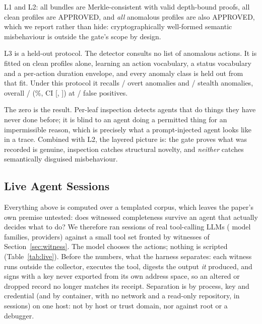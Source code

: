 \documentclass[letterpaper,10pt,twocolumn]{article}
\theoremstyle{definition}
\begin{document}
L1 and L2: all bundles are Merkle-consistent with valid depth-bound proofs, all clean profiles are APPROVED, and \emph{all} anomalous profiles are also APPROVED, which we report rather than hide: cryptographically well-formed semantic misbehaviour is outside the gate's scope by design.

L3 is a held-out protocol. The detector consults no list of anomalous actions. It is fitted on clean profiles alone, learning an action vocabulary, a status vocabulary and a per-action duration envelope, and every anomaly class is held out from that fit. Under this protocol it recalls \insOvertK/\insOvertN{} overt anomalies and \insStealthK/\insStealthN{} stealth anomalies, overall \insRecallK/\insRecallN{} (\insRecallPct\%, CI [\insRecallCIlo, \insRecallCIhi]) at \insFPK/\insFPN{} false positives.

The zero is the result. Per-leaf inspection detects agents that do things they have never done before; it is blind to an agent doing a permitted thing for an impermissible reason, which is precisely what a prompt-injected agent looks like in a trace. Combined with L2, the layered picture is: the gate proves what was recorded is genuine, inspection catches structural novelty, and \emph{neither} catches semantically disguised misbehaviour.

\subsection{Live Agent Sessions}\label{sec:live}
Everything above is computed over a templated corpus, which leaves the paper's
own premise untested: does witnessed completeness survive an agent that actually
decides what to do? We therefore ran \liveSessions{} sessions of real
tool-calling LLMs (\liveModelCount{} model families,
\liveProviderCount{} providers) against a small tool set fronted by
witnesses of Section~\ref{sec:witness}. The model chooses the actions; nothing
is scripted (Table~\ref{tab:live}). Before the numbers, what the harness separates: each witness runs outside the collector, executes the
tool, digests the output \emph{it} produced, and signs with a key never
exported from its own address space, so an altered or dropped record no longer
matches its receipt. Separation is by process, key and
credential  (and by container, with no network and a read-only repository,
in \liveIsoContainer{} sessions)  on one host: not by host or trust domain,
nor against root or a debugger.
\end{document}
